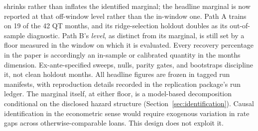 \documentclass[12pt]{article}
\begin{document}
shrinks rather than inflates the identified marginal; the headline marginal is now reported at that off-window level rather than the in-window one. Path A trains on 19 of the 42 QT months, and its ridge-selection holdout doubles as its out-of-sample diagnostic. Path B's \emph{level}, as distinct from its marginal, is still set by a floor measured in the window on which it is evaluated. Every recovery percentage in the paper is accordingly an in-sample or calibrated quantity in the months dimension. Ex-ante-specified sweeps, nulls, parity gates, and bootstraps discipline it, not clean holdout months. All headline figures are frozen in tagged run manifests, with reproduction details recorded in the replication package's run ledger. The marginal itself, at either floor, is a model-based decomposition conditional on the disclosed hazard structure (Section~\ref{sec:identification}). Causal identification in the econometric sense would require exogenous variation in rate gaps across otherwise-comparable loans. This design does not exploit it.
\end{document}
